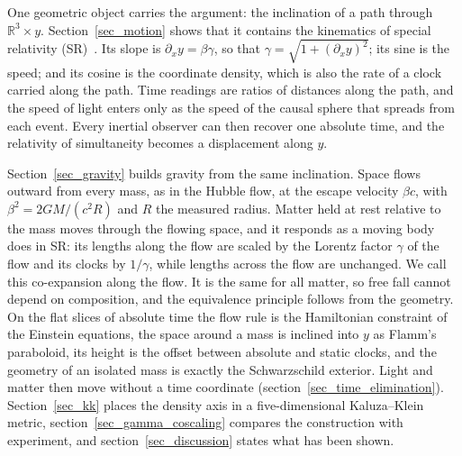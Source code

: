 \documentclass{iopjournal}
\begin{document}
One geometric object carries the argument: the inclination of a path through $\mathbb{R}^3\times y$. Section~\ref{sec_motion} shows that it contains the kinematics of special relativity (SR)~\cite{einstein1905electrodynamics}. Its slope is $\partial_x y=\beta\gamma$, so that $\gamma=\sqrt{1+(\partial_x y)^2}$; its sine is the speed; and its cosine is the coordinate density, which is also the rate of a clock carried along the path. Time readings are ratios of distances along the path, and the speed of light enters only as the speed of the causal sphere that spreads from each event. Every inertial observer can then recover one absolute time, and the relativity of simultaneity becomes a displacement along $y$.

Section~\ref{sec_gravity} builds gravity from the same inclination. Space flows outward from every mass, as in the Hubble flow, at the escape velocity $\beta c$, with $\beta^2=2GM/(c^2R)$ and $R$ the measured radius. Matter held at rest relative to the mass moves through the flowing space, and it responds as a moving body does in SR: its lengths along the flow are scaled by the Lorentz factor $\gamma$ of the flow and its clocks by $1/\gamma$, while lengths across the flow are unchanged. We call this co-expansion along the flow. It is the same for all matter, so free fall cannot depend on composition, and the equivalence principle follows from the geometry. On the flat slices of absolute time the flow rule is the Hamiltonian constraint of the Einstein equations, the space around a mass is inclined into $y$ as Flamm's paraboloid, its height is the offset between absolute and static clocks, and the geometry of an isolated mass is exactly the Schwarzschild exterior. Light and matter then move without a time coordinate (section~\ref{sec_time_elimination}). Section~\ref{sec_kk} places the density axis in a five-dimensional Kaluza--Klein metric, section~\ref{sec_gamma_coscaling} compares the construction with experiment, and section~\ref{sec_discussion} states what has been shown.
\end{document}
